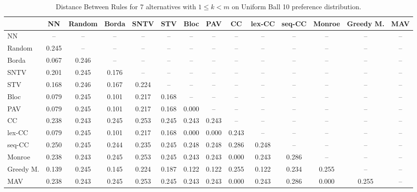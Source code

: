 
\begin{table*}
\centering
\begin{tabular}{lccccccccccccc}
\toprule
 & NN & Random & Borda & SNTV & STV & Bloc & PAV & CC & lex-CC & seq-CC & Monroe & Greedy M. & MAV \\
\midrule
NN & -- & -- & -- & -- & -- & -- & -- & -- & -- & -- & -- & -- & -- \\
Random & 0.245 & -- & -- & -- & -- & -- & -- & -- & -- & -- & -- & -- & -- \\
Borda & 0.067 & 0.246 & -- & -- & -- & -- & -- & -- & -- & -- & -- & -- & -- \\
SNTV & 0.201 & 0.245 & 0.176 & -- & -- & -- & -- & -- & -- & -- & -- & -- & -- \\
STV & 0.168 & 0.246 & 0.167 & 0.224 & -- & -- & -- & -- & -- & -- & -- & -- & -- \\
Bloc & 0.079 & 0.245 & 0.101 & 0.217 & 0.168 & -- & -- & -- & -- & -- & -- & -- & -- \\
PAV & 0.079 & 0.245 & 0.101 & 0.217 & 0.168 & 0.000 & -- & -- & -- & -- & -- & -- & -- \\
CC & 0.238 & 0.243 & 0.245 & 0.253 & 0.245 & 0.243 & 0.243 & -- & -- & -- & -- & -- & -- \\
lex-CC & 0.079 & 0.245 & 0.101 & 0.217 & 0.168 & 0.000 & 0.000 & 0.243 & -- & -- & -- & -- & -- \\
seq-CC & 0.250 & 0.245 & 0.244 & 0.235 & 0.245 & 0.248 & 0.248 & 0.286 & 0.248 & -- & -- & -- & -- \\
Monroe & 0.238 & 0.243 & 0.245 & 0.253 & 0.245 & 0.243 & 0.243 & 0.000 & 0.243 & 0.286 & -- & -- & -- \\
Greedy M. & 0.139 & 0.245 & 0.145 & 0.224 & 0.187 & 0.122 & 0.122 & 0.255 & 0.122 & 0.234 & 0.255 & -- & -- \\
MAV & 0.238 & 0.243 & 0.245 & 0.253 & 0.245 & 0.243 & 0.243 & 0.000 & 0.243 & 0.286 & 0.000 & 0.255 & -- \\
\bottomrule
\end{tabular}

\caption{Distance Between Rules for 7 alternatives with $1 \leq k < m$ on Uniform Ball 10 preference distribution.}
\end{table*}
